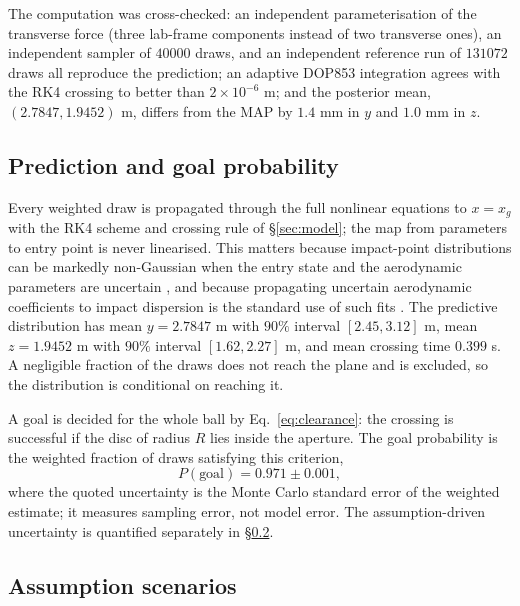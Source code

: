 The computation was cross-checked: an independent parameterisation of the
transverse force (three lab-frame components instead of two transverse ones), an
independent sampler of $40000$ draws, and an independent reference run of
$131072$ draws all reproduce the prediction; an adaptive DOP853 integration
agrees with the RK4 crossing to better than $2\times10^{-6}$ m; and the
posterior mean, $(2.7847,1.9452)$ m, differs from the MAP by $1.4$ mm in $y$
and $1.0$ mm in $z$.

\subsection{Prediction and goal probability}
\label{sec:prediction}
\label{sec:answer}

Every weighted draw is propagated through the full nonlinear equations to
$x=x_g$ with the RK4 scheme and crossing rule of \S\ref{sec:model}; the map from
parameters to entry point is never linearised. This matters because impact-point
distributions can be markedly non-Gaussian when the entry state and the
aerodynamic parameters are uncertain \citep{williamson2017}, and because
propagating uncertain aerodynamic coefficients to impact dispersion is the
standard use of such fits \citep{mehta2015}. The predictive distribution has
mean $y=2.7847$ m with $90\%$ interval $[2.45,3.12]$ m, mean $z=1.9452$ m with
$90\%$ interval $[1.62,2.27]$ m, and mean crossing time $0.399$ s. A negligible
fraction of the draws does not reach the plane and is excluded, so the
distribution is conditional on reaching it.

A goal is decided for the whole ball by Eq.~\eqref{eq:clearance}: the crossing
is successful if the disc of radius $R$ lies inside the aperture. The goal
probability is the weighted fraction of draws satisfying this criterion,
\begin{equation}
  P(\text{goal})=0.971\pm0.001,
  \label{eq:pgoal}
\end{equation}
where the quoted uncertainty is the Monte Carlo standard error of the weighted
estimate; it measures sampling error, not model error. The assumption-driven
uncertainty is quantified separately in \S\ref{sec:scenarios}.

\subsection{Assumption scenarios}
\label{sec:scenarios}


